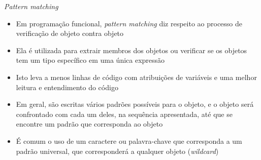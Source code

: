 \begin{frame}[fragile]{\it Pattern matching}

    \begin{itemize}
        \item Em programação funcional, \textit{pattern matching} diz respeito ao processo de
            verificação de objeto contra objeto

        \item Ela é utilizada para extrair membros dos objetos ou verificar se os objetos tem
            um tipo específico em uma única expressão

        \item Isto leva a menos linhas de código com atribuições de variáveis e uma melhor
            leitura e entendimento do código

        \item Em geral, são escritas vários padrões possíveis para o objeto, e o objeto será
            confrontado com cada um deles, na sequência apresentada, até que se encontre
            um padrão que corresponda ao objeto

        \item É comum o uso de um caractere ou palavra-chave que corresponda a um padrão
            universal, que corresponderá a qualquer objeto (\textit{wildcard})


    \end{itemize}

\end{frame}
